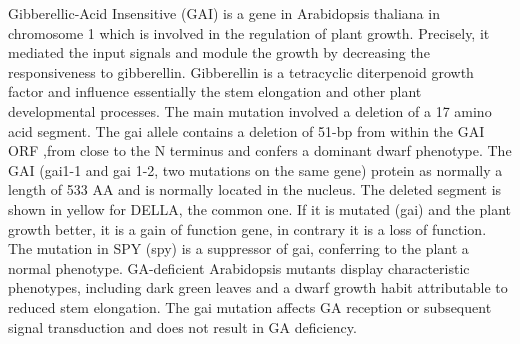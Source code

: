 \documentclass[10pt,a4paper]{article}
\begin{document}
Gibberellic-Acid Insensitive (GAI) is a gene in Arabidopsis thaliana in chromosome 1 
which is involved in the regulation of plant growth.  Precisely, it mediated the input 
signals and module the growth by decreasing the responsiveness to gibberellin\cite{peng_arabidopsis_1997}.
Gibberellin is a tetracyclic diterpenoid growth factor and influence essentially the stem 
elongation and other plant developmental processes\cite{hooley_gibberellins:_nodate}.
The main mutation involved a deletion of a 17 amino acid segment. The gai allele contains
a deletion of 51-bp from within the GAI ORF ,from close to the N terminus and confers a 
dominant dwarf phenotype. The GAI (gai1-1 and gai 1-2, two mutations on the same gene)
protein as normally a length of 533 AA and is normally located in the nucleus. The deleted segment is shown in yellow for DELLA,
the common one\cite{peng_arabidopsis_1997,lee_gibberellin_2002}.
If it is mutated (gai) and the plant growth better, it is a gain of function gene, in contrary it is a loss of function. \\

The mutation in SPY (spy) is a suppressor of gai, conferring to the plant a normal phenotype. 
GA-deficient Arabidopsis mutants display characteristic phenotypes, including dark green leaves 
and a dwarf growth habit attributable to reduced stem elongation\cite{peng_arabidopsis_1997}.
The gai mutation affects GA reception or subsequent signal transduction and does not result in GA deficiency\cite{hooley_gibberellins:_nodate}.


\end{document}
